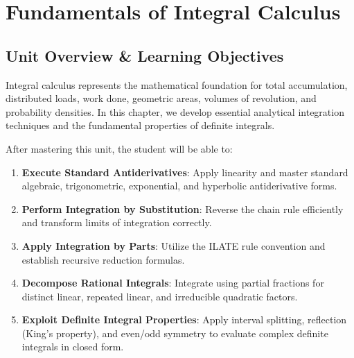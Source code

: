 \chapter{Fundamentals of Integral Calculus}
\label{chap:integral-calculus}

\section{Unit Overview \& Learning Objectives}

Integral calculus represents the mathematical foundation for total accumulation, distributed loads, work done, geometric areas, volumes of revolution, and probability densities. In this chapter, we develop essential analytical integration techniques and the fundamental properties of definite integrals.

\begin{important}
After mastering this unit, the student will be able to:
\begin{enumerate}[leftmargin=1.5em]
    \item \textbf{Execute Standard Antiderivatives}: Apply linearity and master standard algebraic, trigonometric, exponential, and hyperbolic antiderivative forms.
    \item \textbf{Perform Integration by Substitution}: Reverse the chain rule efficiently and transform limits of integration correctly.
    \item \textbf{Apply Integration by Parts}: Utilize the ILATE rule convention and establish recursive reduction formulas.
    \item \textbf{Decompose Rational Integrals}: Integrate using partial fractions for distinct linear, repeated linear, and irreducible quadratic factors.
    \item \textbf{Exploit Definite Integral Properties}: Apply interval splitting, reflection (King's property), and even/odd symmetry to evaluate complex definite integrals in closed form.
\end{enumerate}
\end{important}

